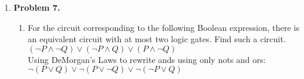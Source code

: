 \documentclass[letterpaper]{article}
\begin{document}
\begin{enumerate}
		\item [] \textbf{Problem 7.}
		\begin{enumerate}
			\item For the circuit corresponding to the following Boolean expression, there is an equivalent circuit with at most two logic gates. Find such a circuit. \\
			$\left( \neg P \wedge \neg Q \right) \vee \left( \neg P \wedge Q \right) \vee \left( P \wedge \neg Q \right)$ \\
			
			Using DeMorgan's Laws to rewrite ands using only nots and ors: \\
			$\neg \left( P \vee Q \right) \vee \neg \left( P \vee \neg Q \right) \vee \neg \left( \neg P \vee Q \right)$
		\end{enumerate}
	\end{enumerate}
\end{document}
